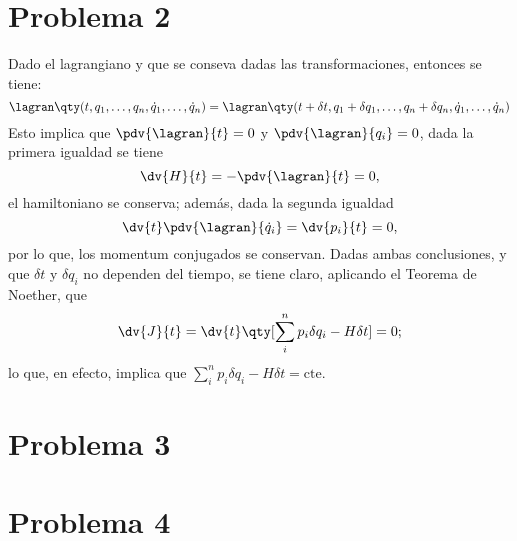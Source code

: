 \section{Problema 2}
Dado el lagrangiano y que se conseva dadas las transformaciones, entonces se tiene:
\begin{displaymath}
	\lagran \qty(t,q_1,\ldots ,q_n ,\dot{q}_1, \ldots ,\dot{q}_n) = \lagran \qty(t + \delta t,q_1 + \delta q_1,\ldots ,q_n + \delta q_n ,\dot{q}_1, \ldots ,\dot{q}_n)
\end{displaymath}
Esto implica que $\pdv{\lagran}{t} = 0$ y $\pdv{\lagran}{q_i} = 0$, dada la primera igualdad se tiene
	$$\dv{H}{t} = -\pdv{\lagran}{t} = 0,$$
el hamiltoniano se conserva; además, dada la segunda igualdad
	$$\dv{t} \pdv{\lagran}{\dot{q}_i} = \dv{p_i}{t} = 0,$$
por lo que, los momentum conjugados se conservan. Dadas ambas conclusiones, y que $\delta t$ y $\delta q_i$ no dependen del tiempo, se tiene claro, aplicando el Teorema de Noether, que
	$$\dv{J}{t} = \dv{t} \qty[\sum_i ^n p_i \delta q_i - H\delta t] = 0;$$
lo que, en efecto, implica que $\displaystyle\sum_i ^n p_i \delta q_i - H\delta t = \text{cte}$. 


\section{Problema 3}




\section{Problema 4}







